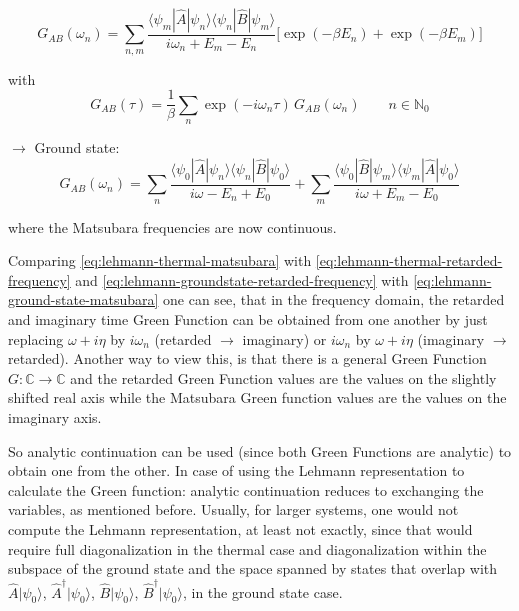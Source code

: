 \begin{equation}
    \boxed{\,G_{AB}(\omega_n) = \sum_{n,m} \frac{\langle\psi_m| \hat{A} |\psi_n\rangle\langle\psi_n| \hat{B} |\psi_m\rangle}{i\omega_n + E_m - E_n} \Big[ \exp(-\beta E_n) + \exp(-\beta E_m) \Big]\,} \label{eq:lehmann-thermal-matsubara}
\end{equation}

with
\begin{equation*}
    G_{AB}(\tau) = \frac{1}{\beta} \sum_n \exp(-i\omega_n \tau)\, G_{AB}(\omega_n) \qquad n \in \mathbb{N}_0
\end{equation*}

$\rightarrow$ Ground state:
\begin{equation}
    \boxed{G_{AB}(\omega_n) = \sum_n \frac{\langle\psi_0| \hat{A} |\psi_n\rangle\langle\psi_n| \hat{B} |\psi_0\rangle}{i\omega - E_n + E_0}
    + \sum_m \frac{\langle\psi_0| \hat{B} |\psi_m\rangle\langle\psi_m| \hat{A} |\psi_0\rangle}{i\omega + E_m - E_0}} \label{eq:lehmann-ground-state-matsubara}
\end{equation}

where the Matsubara frequencies are now continuous.

Comparing \eqref{eq:lehmann-thermal-matsubara} with \eqref{eq:lehmann-thermal-retarded-frequency} and \eqref{eq:lehmann-groundstate-retarded-frequency} with \eqref{eq:lehmann-ground-state-matsubara} one can see,
that in the frequency domain, the retarded and imaginary time Green Function can be obtained from one another
by just replacing $\omega + i\eta$ by $i\omega_n$ (retarded $\rightarrow$ imaginary) or $i\omega_n$ by $\omega + i\eta$ (imaginary $\rightarrow$ retarded). 
Another way to view this, is that there is a general Green Function $G : \mathbb{C} \rightarrow \mathbb{C}$ and the retarded Green Function values are the values on the slightly shifted real axis while the Matsubara Green function values are the values on the imaginary axis.

So analytic continuation can be used (since both Green Functions are analytic) to obtain one from the other. In case of using the Lehmann representation to calculate the Green function: analytic continuation reduces to exchanging the variables, as mentioned before.
Usually, for larger systems, one would not compute the Lehmann representation, at least not exactly, since that would require full diagonalization in the thermal case and diagonalization within the subspace of the ground state and the space spanned by states that overlap with $\hat{A}|\psi_0\rangle$, $\hat{A}^{\dagger}|\psi_0\rangle$, $\hat{B}|\psi_0\rangle$, $\hat{B}^{\dagger}|\psi_0\rangle$, in the ground state case.

